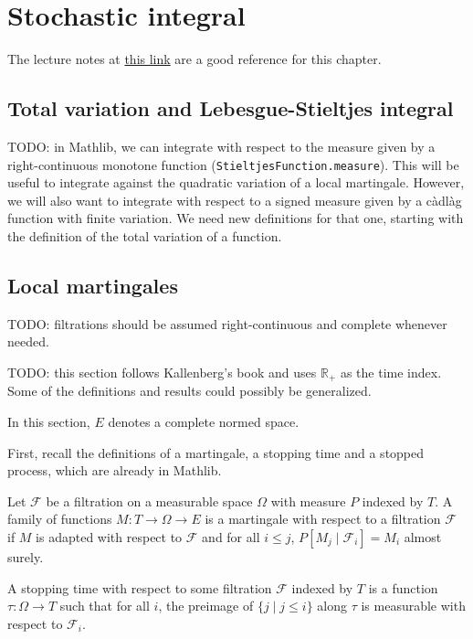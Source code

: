 \chapter{Stochastic integral}

The lecture notes at \href{https://dec41.user.srcf.net/h/III_L/stochastic_calculus_and_applications/}{this link} are a good reference for this chapter.

\section{Total variation and Lebesgue-Stieltjes integral}

TODO: in Mathlib, we can integrate with respect to the measure given by a right-continuous monotone function (\texttt{StieltjesFunction.measure}). This will be useful to integrate against the quadratic variation of a local martingale.
However, we will also want to integrate with respect to a signed measure given by a càdlàg function with finite variation.
We need new definitions for that one, starting with the definition of the total variation of a function.


\section{Local martingales}

TODO: filtrations should be assumed right-continuous and complete whenever needed.

TODO: this section follows Kallenberg's book and uses $\mathbb{R}_+$ as the time index.
Some of the definitions and results could possibly be generalized.

In this section, $E$ denotes a complete normed space.

First, recall the definitions of a martingale, a stopping time and a stopped process, which are already in Mathlib.


\begin{definition}\label{def:Martingale}
  \mathlibok
Let $\mathcal{F}$ be a filtration on a measurable space $\Omega$ with measure $P$ indexed by $T$.
A family of functions $M : T \to \Omega \to E$ is a martingale with respect to a filtration $\mathcal{F}$ if $M$ is adapted with respect to $\mathcal{F}$ and for all $i \le j$, $P[M_j \mid \mathcal{F}_i] = M_i$ almost surely.
\end{definition}


\begin{definition}\label{def:IsStoppingTime}
  \mathlibok
A stopping time with respect to some filtration $\mathcal{F}$ indexed by $T$ is a function $\tau : \Omega \to T$ such that for all $i$, the preimage of $\{j \mid j \le i\}$ along $\tau$ is measurable with respect to $\mathcal{F}_i$.
\end{definition}


